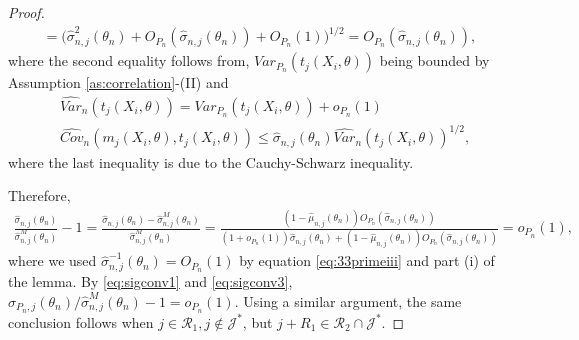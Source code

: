 \documentclass[letterpaper,11pt]{article}
\theoremstyle{myplain}
\theoremstyle{mydefinition}
\theoremstyle{myremark}
\numberwithin{equation}{section}
\numberwithin{figure}{section}
\begin{document}
\begin{appendices}
\begin{proof}
\begin{multline}
=\Big(\hat\sigma_{n,j}^2(\theta_n)+O_{P_n}(\hat\sigma_{n,j}(\theta_n))+O_{P_n}(1)\Big)^{1/2}=O_{P_n}(\hat\sigma_{n,j}(\theta_n)),
\end{multline}
where the second equality follows from,  $Var_{P_n}(t_j(X_i,\theta))$ being bounded by Assumption \ref{as:correlation}-(II) and
\begin{align}
	&\widehat{Var}_{n}(t_j(X_i,\theta))=Var_{P_n}(t_j(X_i,\theta))+o_{P_n}(1)\\
	&\widehat{Cov}_n(m_j(X_i,\theta),t_j(X_i,\theta))\le \hat \sigma_{n,j}(\theta_n)\widehat{Var}_{n}(t_j(X_i,\theta))^{1/2},
\end{align}
where the last inequality is due to the Cauchy-Schwarz inequality.

 Therefore,
\begin{align}
\frac{\hat\sigma_{n,j}(\theta_n)}{\hat\sigma^M_{n,j}(\theta_n)}-1=\frac{\hat\sigma_{n,j}(\theta_n)-\hat\sigma^M_{n,j}(\theta_n)}{\hat \sigma^M_{n,j}(\theta_n)}=
\frac{(1-\hat \mu_{n,j}(\theta_n))O_{P_n}(\hat\sigma_{n,j}(\theta_n))}{(1+o_{ P_n}(1))\hat \sigma_{n,j}(\theta_n)+(1-\hat \mu_{n,j}(\theta_n))O_{P_n}(\hat\sigma_{n,j}(\theta_n))}
=o_{P_n}(1),	\label{eq:sigconv3}
\end{align}
where we used $\hat\sigma_{n,j}^{-1}(\theta_n)=O_{P_n}(1)$ by equation \eqref{eq:33primeiii} and part (i) of the lemma. By \eqref{eq:sigconv1} and \eqref{eq:sigconv3}, $\sigma_{P_n,j}(\theta_n)/\hat\sigma^M_{n,j}(\theta_n)-1=o_{P_n}(1)$.
Using a similar argument, the same conclusion follows when $j\in\mathcal R_1,j\notin \mathcal J^*$, but $j+R_1\in\mathcal R_2\cap \mathcal J^*.$  


\end{proof}
\end{appendices}
\end{document}
